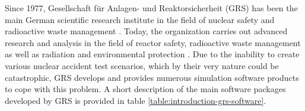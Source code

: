 Since 1977, Gesellschaft für Anlagen- und Reaktorsicherheit (GRS) has been the main German scientific research institute in the field of nuclear safety and radioactive waste management \cite{grs:grs-general-info}. Today, the organization carries out advanced research and analysis in the field of reactor safety, radioactive waste management as well as radiation and environmental protection \cite{grs:grs-general-info}. Due to the inability to create various nuclear accident test scenarios, which by their very nature could be catastrophic, GRS develops and provides numerous simulation software products to cope with this problem. A short description of the main software packages developed by GRS is provided in table \ref{table:introduction-grs-software}.\\


